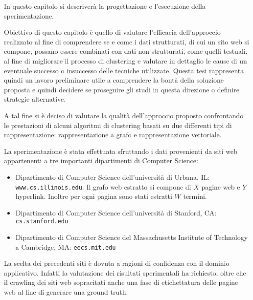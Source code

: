 

In questo capitolo si descriverà la progettazione e l’esecuzione della sperimentazione. 

Obiettivo di questo capitolo è quello di valutare l’efficacia dell'approccio realizzato al fine di comprendere se e come i dati strutturati, di cui un sito web si compone,  possano essere combinati con dati non strutturati, come quelli testuali, al fine di migliorare il processo di clustering e valutare in dettaglio le cause di un eventuale successo o insuccesso delle tecniche utilizzate. Questa tesi rappresenta quindi un lavoro preliminare utile a comprendere la bontà della soluzione proposta e quindi decidere se proseguire gli studi in questa direzione o definire strategie alternative.

A tal fine si è deciso di valutare la qualità dell'approccio proposto confrontando le prestazioni di alcuni algoritmi di clustering basati su due differenti tipi di rappresentazione: rappresentazione a grafo e rappresentazione vettoriale.

La sperimentazione è stata effettuata sfruttando i dati provenienti da siti web appartenenti a tre importanti dipartimenti di Computer Science:
\begin{itemize}
\item Dipartimento di Computer Science dell'università di Urbana, IL:\\
\texttt{www.cs.illinois.edu}. \color{red}Il grafo web estratto si compone di $X$ pagine web e $Y$ hyperlink. Inoltre per ogni pagina sono stati estratti $W$ termini.\color{black}
\item Dipartimento di Computer Science dell'università di Stanford, CA: \texttt{cs.stanford.edu}
\item Dipartimento di Computer Science del  Massachusetts Institute of Technology a Cambridge, MA: \texttt{eecs.mit.edu}
\end{itemize}

La scelta dei precedenti siti è dovuta a ragioni di confidenza con il dominio applicativo. Infatti la valutazione dei risultati sperimentali ha richiesto, oltre che il crawling dei siti web sopracitati anche una fase di etichettatura delle pagine web al fine di generare una ground truth.

